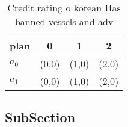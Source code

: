 \documentclass[a4paper]{article}
\begin{document}
\begin{table}
\begin{adjustbox}{width=0.5\columnwidth}
\begin{tabular}{|l|l|l|l|}
\hline
\textbf{plan} & \multicolumn{1}{c|}{\textbf{0}} & \multicolumn{1}{c|}{\textbf{1}} & \multicolumn{1}{c|}{\textbf{2}} \\ \hline
\textbf{$a_0$}  & (0,0) & (1,0) & (2,0) \\ \hline
\textbf{$a_1$}  & (0,0) & (1,0) & (2,0) \\ \hline
\end{tabular}
\end{adjustbox}
\caption{Credit rating o korean Has banned vessels and adv
}
\end{table}

\subsection{SubSection}
\end{document}
